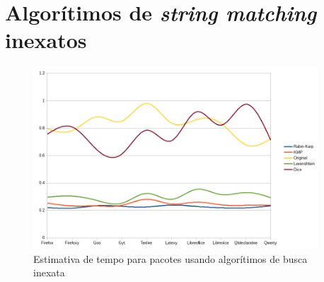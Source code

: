 \section{Algorítimos de \textit{string matching} inexatos} %
\label{sec:algor_timos_de_string_matching_inexatos}

\begin{figure}[htbp]
  \centering
  \includegraphics[width=0.95\textwidth]{figuras/tempo-rk_kmp_std_lev_dice}
  \caption{Estimativa de tempo para pacotes usando algorítimos de busca inexata}
  \label{tempo_rk_kmp_std}
\end{figure}